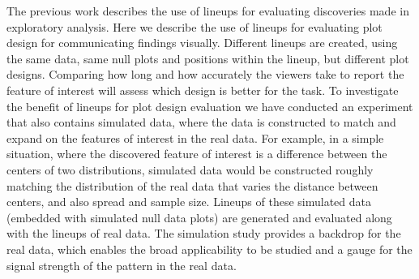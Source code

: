 The previous work \citet{buja:2009,wickham:2010} describes the use of
lineups for evaluating discoveries made in exploratory analysis. Here
we describe the use of lineups for evaluating plot design for
communicating findings visually. Different lineups are created, using
the same data, same null plots and positions within the lineup, but
different plot designs. Comparing how long and how accurately the
viewers take to report the feature of interest will assess which
design is better for the task. To investigate the benefit of lineups
for plot design evaluation we have conducted an experiment that also
contains simulated data, where the data is constructed to match and
expand on the features of interest in the real data. For example, in a
simple situation, where the discovered feature of interest is a
difference between the centers of two distributions, simulated data
would be constructed roughly matching the distribution of the real
data that varies the distance between centers, and also spread and
sample size. Lineups of these simulated data (embedded with simulated
null data plots) are generated and evaluated along with the lineups of
real data. The simulation study provides a backdrop for the real data,
which enables the broad applicability to be studied and a gauge for
the signal strength of the pattern in the real data. 




